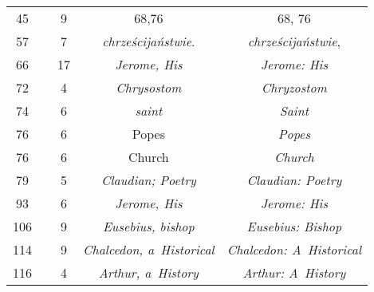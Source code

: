 \documentclass[a4paper,11pt]{article}
\begin{document}
\begin{center}
\begin{tabular}{|c|c|c|c|c|}
    45  & &  9 & 68,76 & 68, 76 \\
    57  & &  7 & \emph{chrześcijaństwie}. & \emph{chrześcijaństwie}, \\
    66  & & 17 & \emph{Jerome, His} & \emph{Jerome: His} \\
    72  & &  4 & \emph{Chrysostom} & \emph{Chryzostom} \\
    74  & &  6 & \emph{saint} & \emph{Saint} \\
    76  & &  6 & Popes & \emph{Popes} \\
    76  & &  6 & Church & \emph{Church} \\
    79  & &  5 & \emph{Claudian; Poetry} & \emph{Claudian: Poetry} \\
    93  & &  6 & \emph{Jerome, His} & \emph{Jerome: His} \\
    106 & &  9 & \emph{Eusebius, bishop} & \emph{Eusebius: Bishop} \\
    114 & &  9 & \emph{Chalcedon, a~Historical}
           & \emph{Chalcedon: A~Historical} \\
    116 & &  4 & \emph{Arthur, a~History} & \emph{Arthur: A~History} \\
    \hline
  \end{tabular}


\end{center}
\end{document}
